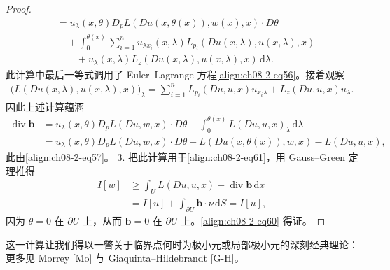 \documentclass[../../main.tex]{subfiles}
\begin{document}
\begin{theorem}[局部极小元]
\begin{proof}
\begin{align*}
&=u_\lambda(x,\theta)D_pL(Du(x,\theta(x)),w(x),x)\cdot D\theta\\
&\quad+\int_0^{\theta(x)}\sum_{i=1}^n u_{\lambda x_i}(x,\lambda)L_{p_i}(Du(x,\lambda),u(x,\lambda),x)\\
&\qquad+u_\lambda(x,\lambda)L_z(Du(x,\lambda),u(x,\lambda),x)\,\mathrm{d}\lambda.
\end{align*}
此计算中最后一等式调用了 Euler--Lagrange 方程\eqref{align:ch08-2-eq56}。接着观察
\begin{align*}
\big(L(Du(x,\lambda),u(x,\lambda),x)\big)_\lambda=\sum_{i=1}^n L_{p_i}(Du,u,x)u_{x_i\lambda}+L_z(Du,u,x)u_\lambda.
\end{align*}
因此上述计算蕴涵
\begin{align*}
\operatorname{div}\mathbf{b}&=u_\lambda(x,\theta)D_pL(Du,w,x)\cdot D\theta+\int_0^{\theta(x)}L(Du,u,x)_\lambda\,\mathrm{d}\lambda\\
&=u_\lambda(x,\theta)D_pL(Du,w,x)\cdot D\theta+L(Du(x,\theta(x)),w,x)-L(Du,u,x),
\end{align*}
此由\eqref{align:ch08-2-eq57}。
3. 把此计算用于\eqref{align:ch08-2-eq61}，用 Gauss--Green 定理推得
\begin{align*}
I[w]&\geqslant\int_U L(Du,u,x)+\operatorname{div}\mathbf{b}\,\mathrm{d}x\\
&=I[u]+\int_{\partial U}\mathbf{b}\cdot\nu\,\mathrm{d}S=I[u],
\end{align*}
因为 $\theta=0$ 在 $\partial U$ 上，从而 $\mathbf{b}=0$ 在 $\partial U$ 上。\eqref{align:ch08-2-eq60} 得证。
\end{proof}
\end{theorem}

这一计算让我们得以一瞥关于临界点何时为极小元或局部极小元的深刻经典理论：更多见 Morrey [Mo] 与 Giaquinta--Hildebrandt [G-H]。
\end{document}
